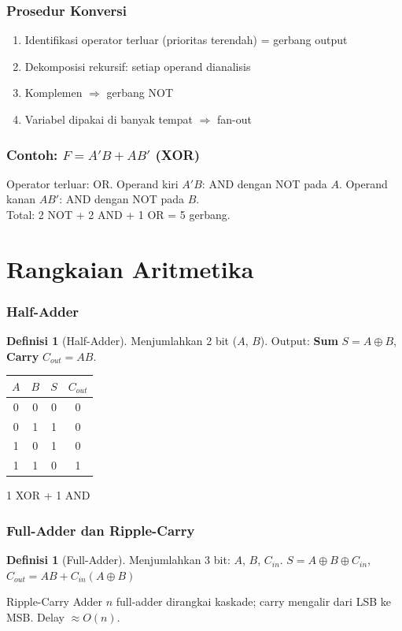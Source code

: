 \documentclass[handout]{beamer}
\theoremstyle{definition}
\newtheorem{definisi}[theorem]{Definisi}
\theoremstyle{example}
\begin{document}
\begin{frame}
\frametitle{Prosedur Konversi}
\begin{enumerate}
  \item Identifikasi operator terluar (prioritas terendah) = gerbang output
  \item Dekomposisi rekursif: setiap operand dianalisis
  \item Komplemen $\Rightarrow$ gerbang NOT
  \item Variabel dipakai di banyak tempat $\Rightarrow$ fan-out
\end{enumerate}
\end{frame}

\begin{frame}
\frametitle{Contoh: $F = A'B + AB'$ (XOR)}
Operator terluar: OR. Operand kiri $A'B$: AND dengan NOT pada $A$. Operand kanan $AB'$: AND dengan NOT pada $B$.\\
Total: 2 NOT + 2 AND + 1 OR = 5 gerbang.
\end{frame}

\section{Rangkaian Aritmetika}

\begin{frame}
\frametitle{Half-Adder}
\begin{definisi}[Half-Adder]
Menjumlahkan 2 bit ($A$, $B$). Output: \textbf{Sum} $S = A \oplus B$, \textbf{Carry} $C_{out} = AB$.
\end{definisi}
\begin{center}
\small
\begin{tabular}{|c|c||c|c|}
\hline
$A$ & $B$ & $S$ & $C_{out}$ \\ \hline
0 & 0 & 0 & 0 \\ \hline
0 & 1 & 1 & 0 \\ \hline
1 & 0 & 1 & 0 \\ \hline
1 & 1 & 0 & 1 \\ \hline
\end{tabular}
\end{center}
1 XOR + 1 AND
\end{frame}

\begin{frame}
\frametitle{Full-Adder dan Ripple-Carry}
\begin{definisi}[Full-Adder]
Menjumlahkan 3 bit: $A$, $B$, $C_{in}$. $S = A \oplus B \oplus C_{in}$, $C_{out} = AB + C_{in}(A \oplus B)$
\end{definisi}
\begin{block}{Ripple-Carry Adder}
$n$ full-adder dirangkai kaskade; carry mengalir dari LSB ke MSB. Delay $\approx O(n)$.
\end{block}
\end{frame}
\end{document}
